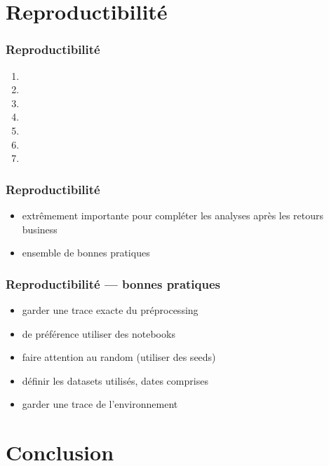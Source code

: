 \documentclass{formation}
\begin{document}
\section{Reproductibilité}

\begin{frame}
  \frametitle{Reproductibilité}

  \begin{enumerate}
  \item {}
  \item {}
  \item {}
  \item {}
  \item {}
  \item {}
  \item {}
  \end{enumerate}
\end{frame}

\begin{frame}
  \frametitle{Reproductibilité}

  \begin{itemize}
  \item extrêmement importante pour compléter les analyses après les
    retours business
  \item ensemble de bonnes pratiques
  \end{itemize}
\end{frame}

\begin{frame}
  \frametitle{Reproductibilité — bonnes pratiques}

  \begin{itemize}[<+->]
  \item garder une trace exacte du préprocessing
  \item de préférence utiliser des notebooks
  \item faire attention au random (utiliser des seeds)
  \item définir les datasets utilisés, dates comprises
  \item garder une trace de l'environnement
  \end{itemize}
\end{frame}

\section{Conclusion}
\end{document}
